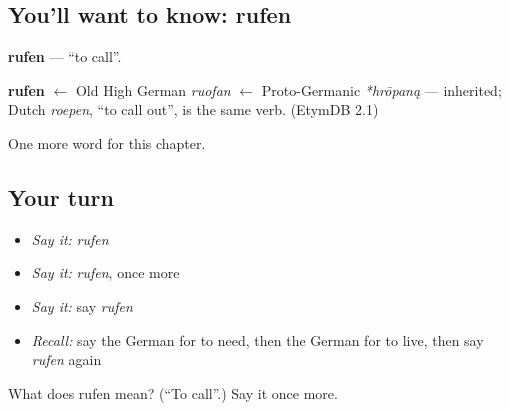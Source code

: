 \subsection*{You'll want to know: rufen}
\textbf{rufen} — \textquotedblleft{}to call\textquotedblright{}.

\begin{cousinweb}
\textbf{rufen} $\leftarrow$ Old High German \emph{ruofan} $\leftarrow$ Proto-Germanic \emph{*hrōpaną} — inherited; Dutch \emph{roepen}, \textquotedblleft{}to call out\textquotedblright{}, is the same verb. (EtymDB 2.1)
\end{cousinweb}

\begin{grammarlens}[title={What you've built}]
One more word for this chapter.
\end{grammarlens}

\subsection*{Your turn}
\begin{itemize}
\raggedright
  \item \emph{Say it:} \emph{rufen}
  \item \emph{Say it:} \emph{rufen}, once more
  \item \emph{Say it:} say \emph{rufen}
  \item \emph{Recall:} say the German for to need, then the German for to live, then say \emph{rufen} again
\end{itemize}

\begin{tcolorbox}[breakable,colback=teal!4,colframe=teal!35!black,title={Before you move on}]
What does rufen mean? (\textquotedblleft{}To call\textquotedblright{}.) Say it once more.
\end{tcolorbox}
